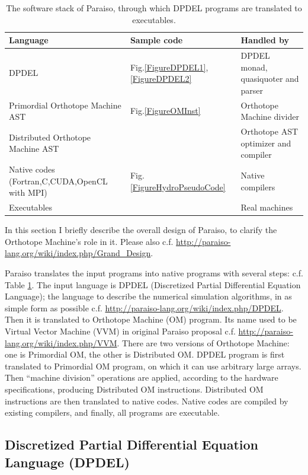 \documentclass[twocolumn]{article}
\begin{document}
\begin{table}
  \begin{tabular}{|l|l|l|}
    \hline 
    Language                             &  Sample code & Handled by \\
    \hline 
    DPDEL                                & Fig.\ref{FigureDPDEL1},\ref{FigureDPDEL2} & DPDEL monad, quasiquoter and parser     \\
    Primordial Orthotope Machine AST     & Fig.\ref{FigureOMInst} & Orthotope Machine divider \\
    Distributed Orthotope Machine AST    & & Orthotope AST optimizer and compiler \\
    Native codes (Fortran,C,CUDA,OpenCL with MPI) & Fig.\ref{FigureHydroPseudoCode} & Native compilers\\
    Executables                          & & Real machines \\
    \hline
  \end{tabular}
  \caption{
    The software stack of Paraiso, through which DPDEL programs are translated to executables.
  }\label{TableSoftwareStack}
\end{table}

In this section I briefly describe the overall design of Paraiso, to clarify
the Orthotope Machine's role in it. Please also
c.f. \url{http://paraiso-lang.org/wiki/index.php/Grand_Design}.

Paraiso translates the input programs into native programs with several steps:
c.f. Table \ref{TableSoftwareStack}. The input language is DPDEL (Discretized
Partial Differential Equation Language); the language to describe the
numerical simulation algorithms, in as simple form as possible
c.f. \url{http://paraiso-lang.org/wiki/index.php/DPDEL}.  Then it is
translated to Orthotope Machine (OM) program. Its name used to be Virtual
Vector Machine (VVM) in original Paraiso proposal c.f.
\url{http://paraiso-lang.org/wiki/index.php/VVM}. There are two versions of
Orthotope Machine: one is Primordial OM, the other is Distributed OM.  DPDEL
program is first translated to Primordial OM program, on which it can use
arbitrary large arrays. Then ``machine division'' operations are applied,
according to the hardware specifications, producing Distributed OM
instructions. Distributed OM instructions are then translated to native
codes. Native codes are compiled by existing compilers, and finally, all
programs are executable.



\subsection{Discretized Partial Differential Equation Language (DPDEL)}
\end{document}
